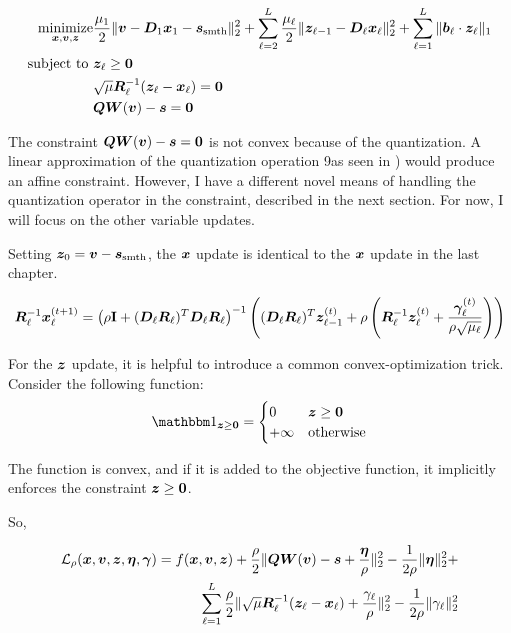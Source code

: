 \begin{equation}
\begin{aligned}
\operatorname*{\text{minimize}}_{\bm{x},\bm{v},\bm{z}} & \frac{\mu_1}{2}\|\bm{v} - \bm{D}_1\bm{x}_1  - \bm{s}_{\text{smth}}\|_2^2 + \sum_{\ell = 2}^L \frac{\mu_{\ell}}{2}\|\bm{z}_{\ell - 1} - \bm{D}_{\ell}\bm{x}_{\ell}\|_2^2 + \sum_{\ell = 1}^L \|\bm{b}_{\ell} \cdot \bm{z}_{\ell}\|_1 \\
\text{subject to } & \bm{z}_{\ell} \geq \bm{0} \\
                   & \sqrt{\mu}\bm{R}_{\ell}^{-1}(\bm{z}_{\ell} - \bm{x}_{\ell}) = \bm{0} \\
                   & \bm{Q}\bm{W}(\bm{v}) - \bm{s} = \bm{0}
\end{aligned}
\end{equation}

The constraint $\bm{Q}\bm{W}(\bm{v}) - \bm{s} = \bm{0}$ is not convex because of the quantization. A linear approximation of the quantization operation 9as seen in \cite{chodosh2020use}) would produce an affine constraint. However, I have a different novel means of handling the quantization operator in the constraint, described in the next section. For now, I will focus on the other variable updates.

Setting $\bm{z}_0 = \bm{v} - \bm{s}_{\text{smth}}$, the $\bm{x}$ update is identical to the $\bm{x}$ update in the last chapter.

\begin{equation}
\bm{R}_{\ell}^{-1}\bm{x}_{\ell}^{(t + 1)} = \left(\rho {\bf I} + (\bm{D}_{\ell}\bm{R}_{\ell})^T\bm{D}_{\ell}\bm{R}_{\ell}\right)^{-1}\left((\bm{D}_{\ell}\bm{R}_{\ell})^T\bm{z}_{\ell - 1}^{(t)} + \rho \left(\bm{R}_{\ell}^{-1}\bm{z}_{\ell}^{(t)} + \frac{\bm{\gamma}_{\ell}^{(t)}}{\rho\sqrt{\mu_{\ell}}}\right)\right)
\end{equation}

For the $\bm{z}$ update, it is helpful to introduce a common convex-optimization trick. Consider the following function:
\begin{equation}
\indicator_{\vz \geq \vzero} = \begin{cases} 0 & \vz \geq \vzero \\ + \infty & \text{otherwise} \end{cases}
\end{equation}

The function is convex, and if it is added to the objective function, it implicitly enforces the constraint $\bm{z} \geq \bm{0}$.

So, 

\begin{equation}
\begin{split}
\mathcal{L}_{\rho}(\bm{x},\bm{v},\bm{z},\bm{\eta},\bm{\gamma}) = f(\bm{x},\bm{v},\bm{z}) + \frac{\rho}{2}\|\bm{Q}\bm{W}(\bm{v}) - \bm{s} + \frac{\bm{\eta}}{\rho}\|_2^2 - \frac{1}{2\rho}\|\bm{\eta}\|_2^2 +  \\ \sum_{\ell = 1}^L \frac{\rho}{2}\|\sqrt{\mu}\bm{R}_{\ell}^{-1}(\bm{z}_{\ell} - \bm{x}_{\ell}) + \frac{\gamma_{\ell}}{\rho}\|_2^2 - \frac{1}{2\rho}\|\gamma_{\ell}\|_2^2
\end{split}
\end{equation}


